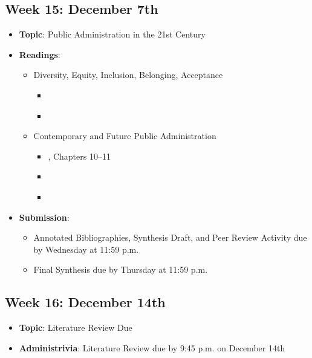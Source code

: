 \documentclass[12pt, letterpaper]{article}
\begin{document}
\subsection*{Week 15: December 7th}
    \begin{itemize}
        \item \textbf{Topic}: Public Administration in the 21st Century
        \item \textbf{Readings}:
            \begin{itemize}
                \item Diversity, Equity, Inclusion, Belonging, Acceptance
                    \begin{itemize}
                        \item \cite{McCandless2022}
                        \item \cite{Jiang2022}
                    \end{itemize}
                \item Contemporary and Future Public Administration
                    \begin{itemize}
                        \item \cite{Denhardt2015}, Chapters 10--11
                        \item \cite{Marvel2016}
                        \item \cite{Robles2023}
                    \end{itemize}
            \end{itemize}
        \item \textbf{Submission}: 
            \begin{itemize}
                \item Annotated Bibliographies, Synthesis Draft, and Peer Review Activity due by Wednesday at 11:59 p.m. 
                \item Final Synthesis due by Thursday at 11:59 p.m.
            \end{itemize}
    \end{itemize}
       

\subsection*{Week 16: December 14th}
    \begin{itemize}
        \item \textbf{Topic}: Literature Review Due
        \item \textbf{Administrivia}: Literature Review due by 9:45 p.m. on December 14th
    \end{itemize}


\singlespace


\end{document}
